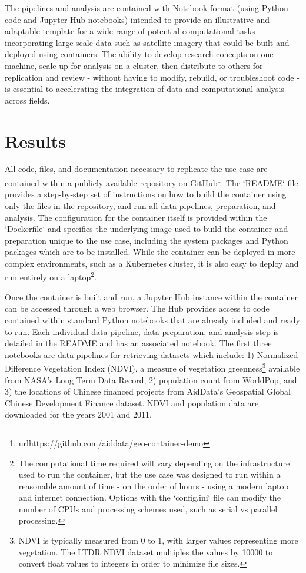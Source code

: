 \documentclass[a4paper]{article}
\begin{document}
The pipelines and analysis are contained with Notebook format (using Python code and Jupyter Hub notebooks) intended to provide an illustrative and adaptable template for a wide range of potential computational tasks incorporating large scale data such as satellite imagery that could be built and deployed using containers. The ability to develop research concepts on one machine, scale up for analysis on a cluster, then distribute to others for replication and review - without having to modify, rebuild, or troubleshoot code - is essential to accelerating the integration of data and computational analysis across fields.


\section{Results}

All code, files, and documentation necessary to replicate the use case are contained within a publicly available repository on GitHub\footnote{url{https://github.com/aiddata/geo-container-demo}}. The `README` file provides a step-by-step set of instructions on how to build the container using only the files in the repository, and run all data pipelines, preparation, and analysis. The configuration for the container itself is provided within the `Dockerfile` and specifies the underlying image used to build the container and preparation unique to the use case, including the system packages and Python packages which are to be installed. While the container can be deployed in more complex environments, such as a Kubernetes cluster, it is also easy to deploy and run entirely on a laptop\footnote{The computational time required will vary depending on the infrastructure used to run the container, but the use case was designed to run within a reasonable amount of time - on the order of hours - using a modern laptop and internet connection. Options with the `config.ini` file can modify the number of CPUs and processing schemes used, such as serial vs parallel processing.}.

Once the container is built and run, a Jupyter Hub instance within the container can be accessed through a web browser. The Hub provides access to code contained within standard Python notebooks that are already included and ready to run. Each individual data pipeline, data preparation, and analysis step is detailed in the README and has an associated notebook. The first three notebooks are data pipelines for retrieving datasets which include: 1) Normalized Difference Vegetation Index (NDVI), a measure of vegetation greenness\footnote{NDVI is typically measured from 0 to 1, with larger values representing more vegetation. The LTDR NDVI dataset multiples the values by 10000 to convert float values to integers in order to minimize file sizes.} available from NASA's Long Term Data Record\citep{NASA2023}, 2) population count from WorldPop\citep{WorldPop2018}, and 3) the locations of Chinese financed projects from AidData's Geospatial Global Chinese Development Finance dataset\citep{Goodman2024}. NDVI and population data are downloaded for the years 2001 and 2011.
\end{document}
